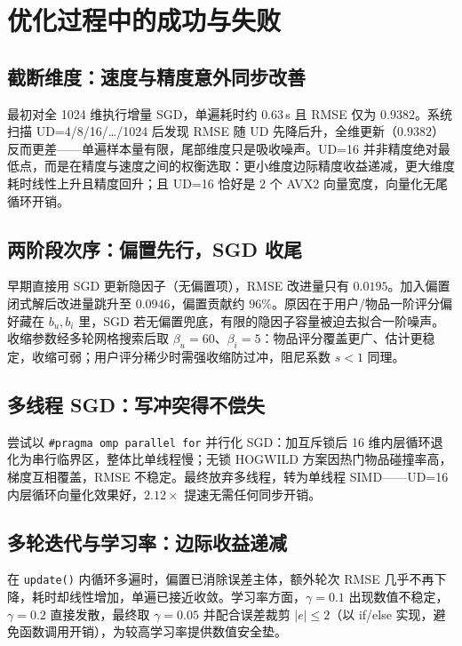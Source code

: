 \documentclass[UTF8,a4paper,10pt]{ctexart}
\newcommand{\xiaosi}{\fontsize{12pt}{20pt}\selectfont}
\newcommand{\nRmseDrop}{0.0946}
\newcommand{\nFullTime}{0.63}        %
\newcommand{\nBiasPct}{96}           %
\newcommand{\nNobiasDrop}{0.0195}
\newcommand{\nSimdSpeed}{2.12}
\begin{document}
\section{优化过程中的成功与失败}
\xiaosi

\subsection{截断维度：速度与精度意外同步改善}

最初对全 1024 维执行增量 SGD，单遍耗时约 $\nFullTime$\,s 且 RMSE 仅为 $0.9382$。系统扫描 UD=4/8/16/…/1024 后发现 RMSE 随 UD 先降后升，全维更新（$0.9382$）反而更差——单遍样本量有限，尾部维度只是吸收噪声。UD=16 并非精度绝对最低点，而是在精度与速度之间的权衡选取：更小维度边际精度收益递减，更大维度耗时线性上升且精度回升；且 UD=16 恰好是 2 个 AVX2 向量宽度，向量化无尾循环开销。

\subsection{两阶段次序：偏置先行，SGD 收尾}

早期直接用 SGD 更新隐因子（无偏置项），RMSE 改进量只有 $\nNobiasDrop$。加入偏置闭式解后改进量跳升至 $\nRmseDrop$，偏置贡献约 $\nBiasPct\%$。原因在于用户/物品一阶评分偏好藏在 $b_u,b_i$ 里，SGD 若无偏置兜底，有限的隐因子容量被迫去拟合一阶噪声。收缩参数经多轮网格搜索后取 $\beta_u{=}60$、$\beta_i{=}5$：物品评分覆盖更广、估计更稳定，收缩可弱；用户评分稀少时需强收缩防过冲，阻尼系数 $s{<}1$ 同理。

\subsection{多线程 SGD：写冲突得不偿失}

尝试以 \texttt{\#pragma omp parallel for} 并行化 SGD：加互斥锁后 16 维内层循环退化为串行临界区，整体比单线程慢；无锁 HOGWILD 方案因热门物品碰撞率高，梯度互相覆盖，RMSE 不稳定。最终放弃多线程，转为单线程 SIMD——UD=16 内层循环向量化效果好，$\nSimdSpeed\times$ 提速无需任何同步开销。

\subsection{多轮迭代与学习率：边际收益递减}

在 \texttt{update()} 内循环多遍时，偏置已消除误差主体，额外轮次 RMSE 几乎不再下降，耗时却线性增加，单遍已接近收敛。学习率方面，$\gamma{=}0.1$ 出现数值不稳定，$\gamma{=}0.2$ 直接发散，最终取 $\gamma{=}0.05$ 并配合误差裁剪 $|e|\le2$（以 if/else 实现，避免函数调用开销），为较高学习率提供数值安全垫。
\end{document}
